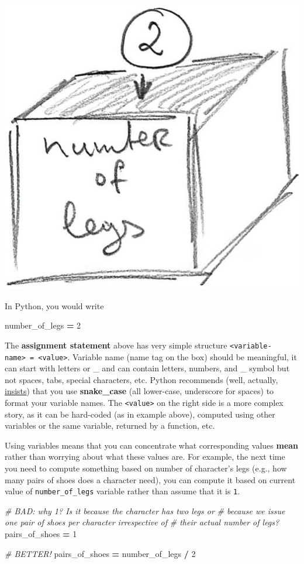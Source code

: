 \documentclass[
]{book}
\newenvironment{Shaded}{\begin{snugshade}}{\end{snugshade}}
\newcommand{\CommentTok}[1]{\textcolor[rgb]{0.56,0.35,0.01}{\textit{#1}}}
\newcommand{\DecValTok}[1]{\textcolor[rgb]{0.00,0.00,0.81}{#1}}
\newcommand{\NormalTok}[1]{#1}
\newcommand{\OperatorTok}[1]{\textcolor[rgb]{0.81,0.36,0.00}{\textbf{#1}}}
\begin{document}
\begin{center}\includegraphics[width=0.5\linewidth]{images/variable-as-box} \end{center}

In Python, you would write

\begin{Shaded}
\begin{Highlighting}[]
\NormalTok{number\_of\_legs }\OperatorTok{=} \DecValTok{2}
\end{Highlighting}
\end{Shaded}

The \textbf{assignment statement} above has very simple structure \texttt{\textless{}variable-name\textgreater{}\ =\ \textless{}value\textgreater{}}. Variable name (name tag on the box) should be meaningful, it can start with letters or \_ and can contain letters, numbers, and \_ symbol but not spaces, tabs, special characters, etc. Python recommends (well, actually, \href{https://www.python.org/dev/peps/pep-0008/}{insists}) that you use \textbf{snake\_case} (all lower-case, underscore for spaces) to format your variable names. The \texttt{\textless{}value\textgreater{}} on the right side is a more complex story, as it can be hard-coded (as in example above), computed using other variables or the same variable, returned by a function, etc.

Using variables means that you can concentrate what corresponding values \textbf{mean} rather than worrying about what these values are. For example, the next time you need to compute something based on number of character's legs (e.g., how many pairs of shoes does a character need), you can compute it based on current value of \texttt{number\_of\_legs} variable rather than assume that it is \texttt{1}.

\begin{Shaded}
\begin{Highlighting}[]
\CommentTok{\# BAD: why 1? Is it because the character has two legs or}
\CommentTok{\# because we issue one pair of shoes per character irrespective of}
\CommentTok{\# their actual number of legs?}
\NormalTok{pairs\_of\_shoes }\OperatorTok{=} \DecValTok{1}

\CommentTok{\# BETTER!}
\NormalTok{pairs\_of\_shoes }\OperatorTok{=}\NormalTok{ number\_of\_legs }\OperatorTok{/} \DecValTok{2}
\end{Highlighting}
\end{Shaded}
\end{document}
